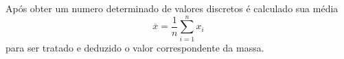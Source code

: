 Após obter um numero determinado de valores discretos é calculado sua média
\begin{equation}
	\label{eq:Mean}
	\overline{x}  =  \frac{1}{n}\sum_{i=1}^n x_i
\end{equation}
para ser tratado e deduzido o valor correspondente da massa.
\newpage
